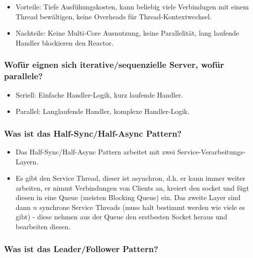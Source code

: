 \documentclass[10pt,a4paper]{scrartcl}
\begin{document}
\begin{itemize}
	\item Vorteile: Tiefe Ausfühungskosten, kann beliebig viele Verbindugen mit einem Thread
		bewältigen, keine Overheads für Thread-Kontextwechsel.
	\item Nachteile: Keine Multi-Core Ausnutzung, keine Parallelität, lang laufende Handler blockieren
		den Reactor.
\end{itemize}

\subsubsection{Wofür eignen sich iterative/sequenzielle Server, wofür parallele?}

\begin{itemize}
	\item Seriell: Einfache Handler-Logik, kurz laufende Handler.
	\item Parallel: Langlaufende Handler, komplexe Handler-Logik.
\end{itemize}

\subsubsection{Was ist das Half-Sync/Half-Async Pattern?}

\begin{itemize}
	\item Das Half-Sync/Half-Async Pattern arbeitet mit zwei Service-Verarbeitungs-Layern.
	\item Es gibt den Service Thread, dieser ist asynchron, d.h. er kann immer weiter arbeiten, er
		nimmt Verbindungen von Clients an, kreiert den socket und fügt diesen in eine Queue (meisten
		Blocking Queue) ein. Das zweite Layer sind dann $n$ synchrone Service Threads (muss halt bestimmt
		werden wie viele es gibt) - diese nehmen aus der Queue den erstbesten Socket heraus und
		bearbeiten diesen.
\end{itemize}

\subsubsection{Was ist das Leader/Follower Pattern?}
\end{document}
